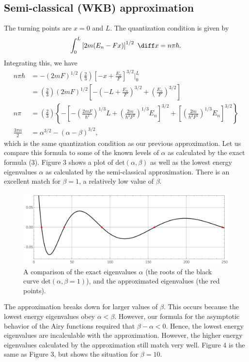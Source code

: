 \documentclass[12pt]{article}
\begin{document}
\subsection*{Semi-classical (WKB) approximation}
The turning points are $x = 0$ and $L$.  The quantization condition is given by
\[
	\int_{0}^{L} \left[ 2m(E_n - Fx) \right]^{1/2} \ \diff x = n \pi \hbar.
\] 
Integrating this, we have
\begin{align*}
	n\pi \hbar &= -(2mF)^{1/2} \left( \frac{2}{3} \right) \left[ -x + \frac{E_n}{F} \right]^{3/2}\Bigg|_{0}^{L} \\
		   &= \left( \frac{2}{3} \right)(2mF)^{1/2} \left[ -\left( -L + \frac{E_n}{F} \right)^{3/2} + \left( \frac{E_n}{F} \right)^{3/2} \right] \\
	n \pi &= \left( \frac{2}{3} \right)\left\{ -\left[ -\left( \frac{2mF}{\hbar^2} \right)^{1/3}L + \left( \frac{2m}{\hbar^2 F^2} \right)^{1/3}E_n \right]^{3/2} + \left[ \left( \frac{2m}{\hbar^2 F^2} \right)^{1/3} E_n \right]^{3/2} \right\} \\
	       \frac{3\pi n}{2} &= 	\alpha^{3/2} - (\alpha - \beta)^{3/2}  ,
\end{align*}
which is the same quantization condition as our previous approximation.  Let us compare this formula to some of the known levels of $\alpha$ as calculated by the exact formula (3).  Figure 3 shows a plot of $\text{det}(\alpha, \beta)$ as well as the lowest energy eigenvalues $\alpha$ as calculated by the semi-classical approximation.  There is an excellent match for $\beta = 1$, a relatively low value of $\beta$.  

\begin{figure}[ht]
	\centering
	\includegraphics[width=\textwidth]{figures/plot3.png}
	\caption{A comparison of the exact eigenvalues $\alpha$ (the roots of the black curve $\text{det}(\alpha,\beta=1) $), and the approximated eigenvalues (the red points).}
\end{figure}

The approximation breaks down for larger values of $\beta$.  This occurs because the lowest energy eigenvalues obey $\alpha < \beta$.  However, our formula for the asymptotic behavior of the Airy functions required that $\beta - \alpha < 0$.  Hence, the lowest energy eigenvalues are incalculable with the approximation.  However, the higher energy eigenvalues calculated by the approximation still match very well.  Figure 4 is the same as Figure 3, but shows the situation for $\beta = 10$.   
\end{document}
